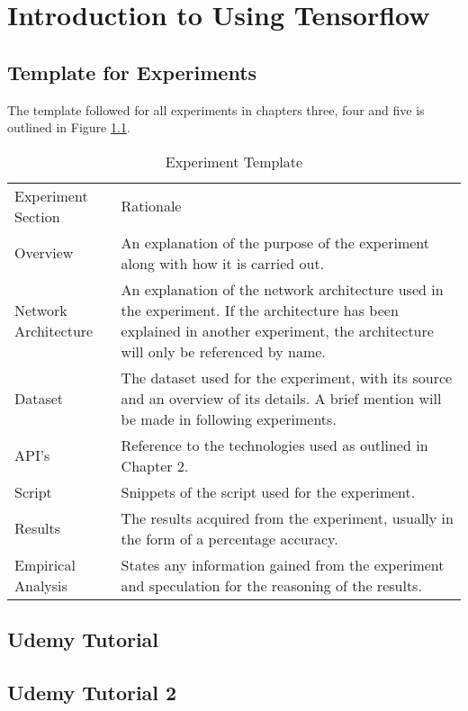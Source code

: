 \chapter{Introduction to Using Tensorflow}
\section{Template for Experiments}
The template followed for all experiments in chapters three, four and five is outlined in Figure \ref{fig:expTemplate}.

\begin{table}[]
\centering
\caption{Experiment Template}
\label{fig:expTemplate}
\begin{tabular}{|p{4cm}|p{11cm}|}
Experiment Section   & Rationale                \\
Overview             & An explanation of the purpose of the experiment along with how it is carried out. \\
Network Architecture & An explanation of the network architecture used in the experiment. If the architecture has been explained in another experiment, the architecture will only be referenced by name.                       \\
Dataset              & The dataset used for the experiment, with its source and an overview of its details. A brief mention will be made in following experiments.                       \\
API's                & Reference to the technologies used as outlined in Chapter 2.                      \\
Script               & Snippets of the script used for the experiment.                       \\
Results              & The results acquired from the experiment, usually in the form of a percentage accuracy.                       \\
Empirical Analysis   & States any information gained from the experiment and speculation for the reasoning of the results.                      
\end{tabular}
\end{table}

\section{Udemy Tutorial}
\label{udemy1}


\section{Udemy Tutorial 2}
\label{udemy2}


